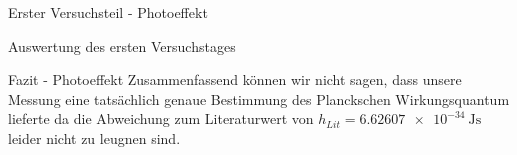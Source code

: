 \documentclass[pdftex, a4paper,11pt, twoside, ngerman]{report}
\begin{document}
\begin{chapter}{Erster Versuchsteil - Photoeffekt}
\begin{section}{Auswertung des ersten Versuchstages}
    \end{section}
    
    
    
    \begin{section}{Fazit - Photoeffekt}
      \label{chp:Photoeffekt:sec:Fazit}
      Zusammenfassend können wir nicht sagen, dass unsere Messung eine
      tatsächlich genaue Bestimmung des Planckschen Wirkungsquantum lieferte da 
      die Abweichung zum Literaturwert von 
      $h_{Lit}=\SI{6.62607e-34}{\joule\second}$ leider nicht zu leugnen sind.
      
      
    \end{section}
    
  \end{chapter}
  
  
  
\end{document}

